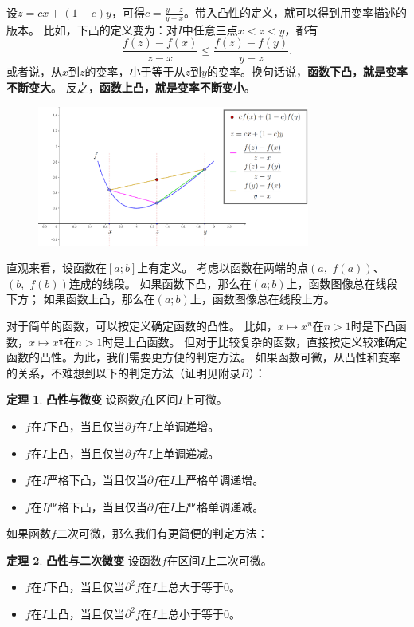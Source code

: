 \documentclass[12pt,UTF8]{ctexbook}
\theoremstyle{definition}
\newtheorem{tm}{定理}[section]
\theoremstyle{plain}
\begin{document}
设$z = cx + (1 - c)y$，可得$c = \frac{y - z}{y - x}$。带入凸性的定义，就可以得到用变率描述的版本。
比如，下凸的定义变为：对$I$中任意三点$x < z < y$，都有
$$ \frac{f(z) - f(x)}{z - x} \leqslant \frac{f(z) - f(y)}{y - z}. $$
或者说，从$x$到$z$的变率，小于等于从$z$到$y$的变率。换句话说，\textbf{函数下凸，就是变率不断变大}。
反之，\textbf{函数上凸，就是变率不断变小}。

\begin{figure}[h]
    \centering
    \includegraphics[width=0.8\textwidth]{tu/凸函数变率1.png}
\end{figure}

直观来看，设函数在$[a; b]$上有定义。
考虑以函数在两端的点$(a,\,\, f(a))$、$(b,\,\, f(b))$连成的线段。
如果函数下凸，那么在$(a;b)$上，函数图像总在线段下方；
如果函数上凸，那么在$(a;b)$上，函数图像总在线段上方。

对于简单的函数，可以按定义确定函数的凸性。
比如，$x\mapsto x^n$在$n>1$时是下凸函数，$x\mapsto x^\frac{1}{n}$在$n>1$时是上凸函数。
但对于比较复杂的函数，直接按定义较难确定函数的凸性。为此，我们需要更方便的判定方法。
如果函数可微，从凸性和变率的关系，不难想到以下的判定方法（证明见附录$B$）：

\begin{tm}{\textbf{凸性与微变}}
    设函数$f$在区间$I$上可微。
    \begin{itemize}
        \item $f$在$I$下凸，当且仅当$\partial f$在$I$上单调递增。
        \item $f$在$I$上凸，当且仅当$\partial f$在$I$上单调递减。
        \item $f$在$I$严格下凸，当且仅当$\partial f$在$I$上严格单调递增。
        \item $f$在$I$严格下凸，当且仅当$\partial f$在$I$上严格单调递减。
    \end{itemize}
\end{tm}

如果函数$f$二次可微，那么我们有更简便的判定方法：
\begin{tm}\textbf{凸性与二次微变}
    设函数$f$在区间$I$上二次可微。
    \begin{itemize}
        \item $f$在$I$下凸，当且仅当$\partial^2 f$在$I$上总大于等于$0$。
        \item $f$在$I$上凸，当且仅当$\partial^2 f$在$I$上总小于等于$0$。
    \end{itemize}
\end{tm}
\end{document}
